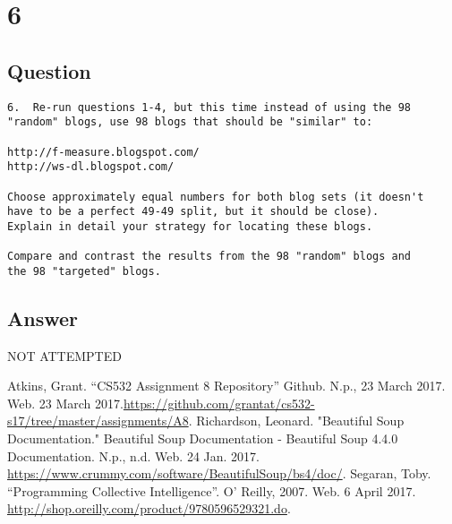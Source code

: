 \documentclass[letterpaper,11pt]{article}
\begin{document}
\section*{6}

\subsection*{Question}

\begin{verbatim}
6.  Re-run questions 1-4, but this time instead of using the 98 
"random" blogs, use 98 blogs that should be "similar" to:

http://f-measure.blogspot.com/
http://ws-dl.blogspot.com/

Choose approximately equal numbers for both blog sets (it doesn't
have to be a perfect 49-49 split, but it should be close).  
Explain in detail your strategy for locating these blogs.  

Compare and contrast the results from the 98 "random" blogs and 
the 98 "targeted" blogs. 
\end{verbatim}

\subsection*{Answer}

\begin{center}
\Huge{NOT ATTEMPTED}
\end{center}


\clearpage


\clearpage



\begin{thebibliography}{9}
Atkins, Grant. ``CS532 Assignment 8 Repository'' Github. N.p., 23 March 2017. Web. 23 March 2017.\url{https://github.com/grantat/cs532-s17/tree/master/assignments/A8}.
Richardson, Leonard. "Beautiful Soup Documentation." Beautiful Soup Documentation - Beautiful Soup 4.4.0 Documentation. N.p., n.d. Web. 24 Jan. 2017. \url{https://www.crummy.com/software/BeautifulSoup/bs4/doc/}.
Segaran, Toby. ``Programming Collective Intelligence''. O' Reilly, 2007. Web. 6 April 2017. \url{http://shop.oreilly.com/product/9780596529321.do}.
\end{thebibliography}
\end{document}
